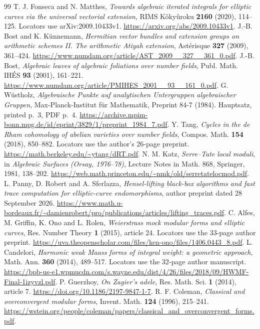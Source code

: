 \documentclass[11pt]{article}
\theoremstyle{definition}\newtheorem{definition}[theorem]{Definition}
\theoremstyle{remark}\newtheorem{remark}[theorem]{Remark}
\begin{document}
\begin{thebibliography}{99}
 T. J. Fonseca and N. Matthes, \emph{Towards algebraic iterated integrals for elliptic curves via the universal vectorial extension}, RIMS K\^oky\^uroku \textbf{2160} (2020), 114--125. Locators use arXiv:2009.10433v1. \url{https://arxiv.org/abs/2009.10433v1}.
 J.-B. Bost and K. K\"unnemann, \emph{Hermitian vector bundles and extension groups on arithmetic schemes II. The arithmetic Atiyah extension}, Ast\'erisque \textbf{327} (2009), 361--424. \url{https://www.numdam.org/article/AST_2009__327__361_0.pdf}.
 J.-B. Bost, \emph{Algebraic leaves of algebraic foliations over number fields}, Publ. Math. IH\'ES \textbf{93} (2001), 161--221. \url{https://www.numdam.org/article/PMIHES_2001__93__161_0.pdf}.
 G. W\"ustholz, \emph{Algebraische Punkte auf analytischen Untergruppen algebraischer Gruppen}, Max-Planck-Institut f\"ur Mathematik, Preprint 84-7 (1984). Hauptsatz, printed p.~3, PDF p.~4. \url{https://archive.mpim-bonn.mpg.de/id/eprint/3829/1/preprint_1984_7.pdf}.
 Y. Tang, \emph{Cycles in the de Rham cohomology of abelian varieties over number fields}, Compos. Math. \textbf{154} (2018), 850--882. Locators use the author's 26-page preprint. \url{https://math.berkeley.edu/~ytang/dRT.pdf}.
 N. M. Katz, \emph{Serre--Tate local moduli}, in \emph{Algebraic Surfaces (Orsay, 1976--78)}, Lecture Notes in Math. 868, Springer, 1981, 138--202. \url{https://web.math.princeton.edu/~nmk/old/serretatelocmod.pdf}.
 L. Panny, D. Robert and A. Sferlazza, \emph{Hensel-lifting black-box algorithms and fast trace computation for elliptic-curve endomorphisms}, author preprint dated 28 September 2026. \url{https://www.math.u-bordeaux.fr/~damienrobert/pro/publications/articles/lifting_traces.pdf}.
 C. Alfes, M. Griffin, K. Ono and L. Rolen, \emph{Weierstrass mock modular forms and elliptic curves}, Res. Number Theory \textbf{1} (2015), article 24. Locators use the 33-page author preprint. \url{https://uva.theopenscholar.com/files/ken-ono/files/1406.0443_8.pdf}.
 L. Candelori, \emph{Harmonic weak Maass forms of integral weight: a geometric approach}, Math. Ann. \textbf{360} (2014), 489--517. Locators use the 32-page author manuscript. \url{https://bpb-us-e1.wpmucdn.com/s.wayne.edu/dist/4/26/files/2018/09/HWMF-Final-1izyvzl.pdf}.
 P. Guerzhoy, \emph{On Zagier's adele}, Res. Math. Sci. \textbf{1} (2014), article 7. \url{https://doi.org/10.1186/2197-9847-1-7}.
 R. F. Coleman, \emph{Classical and overconvergent modular forms}, Invent. Math. \textbf{124} (1996), 215--241. \url{https://wstein.org/people/coleman/papers/classical_and_overconvergent_forms.pdf}.

\end{thebibliography}
\end{document}
